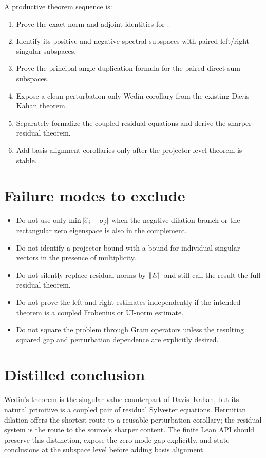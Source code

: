 A productive theorem sequence is:
\begin{enumerate}[leftmargin=2em]
\item Prove the exact norm and adjoint identities for .
\item Identify its positive and negative spectral subspaces with paired left/right singular subspaces.
\item Prove the principal-angle duplication formula for the paired direct-sum subspaces.
\item Expose a clean perturbation-only Wedin corollary from the existing Davis--Kahan theorem.
\item Separately formalize the coupled residual equations and derive the sharper residual theorem.
\item Add basis-alignment corollaries only after the projector-level theorem is stable.
\end{enumerate}

\section{Failure modes to exclude}

\begin{itemize}[leftmargin=2em]
\item Do not use only $\min\left\lvert \widetilde\sigma_i-\sigma_j\right\rvert$ when the negative dilation branch or the rectangular zero eigenspace is also in the complement.
\item Do not identify a projector bound with a bound for individual singular vectors in the presence of multiplicity.
\item Do not silently replace residual norms by $\left\lVert E\right\rVert$ and still call the result the full residual theorem.
\item Do not prove the left and right estimates independently if the intended theorem is a coupled Frobenius or UI-norm estimate.
\item Do not square the problem through Gram operators unless the resulting squared gap and perturbation dependence are explicitly desired.
\end{itemize}

\section*{Distilled conclusion}

Wedin's theorem is the singular-value counterpart of Davis--Kahan, but its natural primitive is a coupled pair of residual Sylvester equations. Hermitian dilation offers the shortest route to a reusable perturbation corollary; the residual system is the route to the source's sharper content. The finite Lean API should preserve this distinction, expose the zero-mode gap explicitly, and state conclusions at the subspace level before adding basis alignment.


